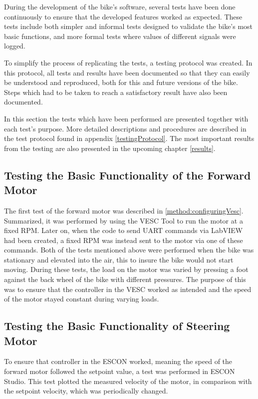 During the development of the bike's software, several tests have been done continuously to ensure that the developed features worked as expected. These tests include both simpler and informal tests designed to validate the bike's most basic functions, and more formal tests where values of different signals were logged.

To simplify the process of replicating the tests, a testing protocol was created. In this protocol, all tests and results have been documented so that they can easily be understood and reproduced, both for this and future versions of the bike. Steps which had to be taken to reach a satisfactory result have also been documented.

In this section the tests which have been performed are presented together with each test's purpose. More detailed descriptions and procedures are described in the test protocol found in appendix \ref{testingProtocol}. The most important results from the testing are also presented in the upcoming chapter \ref{results}.

\subsection{Testing the Basic Functionality of the Forward Motor}

The first test of the forward motor was described in \ref{method:configuringVesc}. Summarized, it was performed by using the VESC Tool to run the motor at a fixed RPM. Later on, when the code to send UART commands via LabVIEW had been created, a fixed RPM was instead sent to the motor via one of these commands. Both of the tests mentioned above were performed when the bike was stationary and elevated into the air, this to insure the bike would not start moving. During these tests, the load on the motor was varied by pressing a foot against the back wheel of the bike with different pressures. The purpose of this was to ensure that the controller in the VESC worked as intended and the speed of the motor stayed constant during varying loads.

\subsection{Testing the Basic Functionality of Steering Motor}

To ensure that controller in the ESCON worked, meaning the speed of the forward motor followed the setpoint value, a test was performed in ESCON Studio. This test plotted the measured velocity of the motor, in comparison with the setpoint velocity, which was periodically changed.

